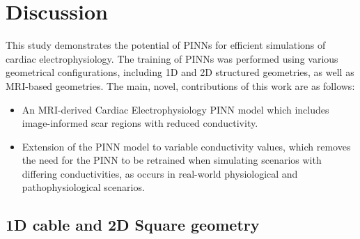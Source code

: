 \chapter{Discussion}
This study demonstrates the potential of PINNs for efficient simulations of cardiac electrophysiology. The training of PINNs was performed using various geometrical configurations, including 1D and 2D structured geometries, as well as  MRI-based geometries. The main, novel, contributions of this work are as follows:
\begin{itemize}
    \item An MRI-derived Cardiac Electrophysiology PINN model which includes image-informed scar regions with reduced conductivity.
    \item Extension of the PINN model to variable conductivity values, which  removes the need for the PINN to be retrained when simulating scenarios with differing conductivities, as occurs in real-world physiological and pathophysiological scenarios. 
\end{itemize}

\section{1D cable and 2D Square geometry}

